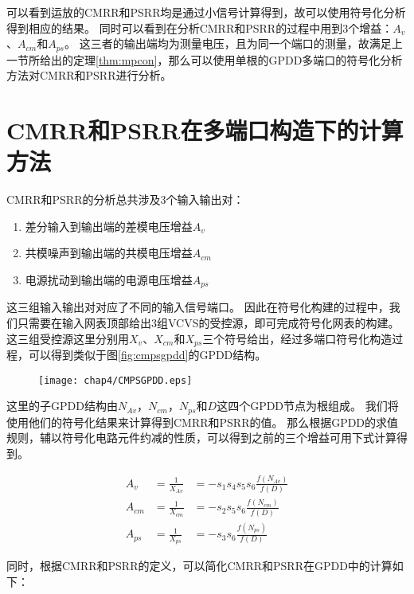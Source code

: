可以看到运放的CMRR和PSRR均是通过小信号计算得到，故可以使用符号化分析得到相应的结果。
同时可以看到在分析CMRR和PSRR的过程中用到3个增益：$A_v$、$A_{cm}$和$A_{ps}$。
这三者的输出端均为测量电压，且为同一个端口的测量，故满足上一节所给出的定理\ref{thm:mpcon}，那么可以使用单根的GPDD多端口的符号化分析方法对CMRR和PSRR进行分析。

\section{CMRR和PSRR在多端口构造下的计算方法}

CMRR和PSRR的分析总共涉及3个输入输出对：

\begin{enumerate}
	\item 差分输入到输出端的差模电压增益$A_v$
	\item 共模噪声到输出端的共模电压增益$A_{cm}$
	\item 电源扰动到输出端的电源电压增益$A_{ps}$
\end{enumerate}

这三组输入输出对对应了不同的输入信号端口。
因此在符号化构建的过程中，我们只需要在输入网表顶部给出3组VCVS的受控源，即可完成符号化网表的构建。
这三组受控源这里分别用$X_v$、$X_{cm}$和$X_{ps}$三个符号给出，经过多端口符号化构造过程，可以得到类似于图\ref{fig:cmpsgpdd}的GPDD结构。

\begin{figure}[!htp]
	\centering
	\texttt{[image: chap4/CMPSGPDD.eps]}
\end{figure}

这里的子GPDD结构由$N_{Av}$，$N_{cm}$，$N_{ps}$和$D$这四个GPDD节点为根组成。
我们将使用他们的符号化结果来计算得到CMRR和PSRR的值。
那么根据GPDD的求值规则，辅以符号化电路元件约减的性质，可以得到之前的三个增益可用下式计算得到。

\begin{eqnarray}
A_v     &= \frac{1}{X_{Av}} &= - s_1 s_4 s_5 s_6 \frac{f\left(N_{Av}\right)}{f\left(D\right)}\\
A_{cm}  &= \frac{1}{X_{cm}} &= - s_2 s_5 s_6 \frac{f\left(N_{cm}\right)}{f\left(D\right)}\\
A_{ps}  &= \frac{1}{X_{ps}} &= - s_3 s_6 \frac{f\left(N_{ps}\right)}{f\left(D\right)}
\end{eqnarray}

同时，根据CMRR和PSRR的定义，可以简化CMRR和PSRR在GPDD中的计算如下：

